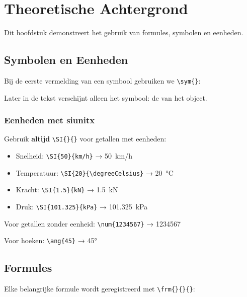 
\chapter{Theoretische Achtergrond}
\label{ch:theorie}

Dit hoofdstuk demonstreert het gebruik van formules, symbolen en eenheden.

\section{Symbolen en Eenheden}

Bij de eerste vermelding van een symbool gebruiken we \verb|\sym{}|:


Later in de tekst verschijnt alleen het symbool: de  van het object.

\subsection{Eenheden met siunitx}

\begin{theorieblok}[title=Correcte eenheden met siunitx]
Gebruik \textbf{altijd} \verb|\SI{}{}| voor getallen met eenheden:
\begin{itemize}
    \item Snelheid: \verb|\SI{50}{km/h}| → \SI{50}{km/h}
    \item Temperatuur: \verb|\SI{20}{\degreeCelsius}| → \SI{20}{\degreeCelsius}
    \item Kracht: \verb|\SI{1.5}{kN}| → \SI{1.5}{kN}
    \item Druk: \verb|\SI{101.325}{kPa}| → \SI{101.325}{kPa}
\end{itemize}

Voor getallen zonder eenheid: \verb|\num{1234567}| → \num{1234567}

Voor hoeken: \verb|\ang{45}| → \ang{45}
\end{theorieblok}

\section{Formules}

Elke belangrijke formule wordt geregistreerd met \verb|\frm{}{}{}|:

